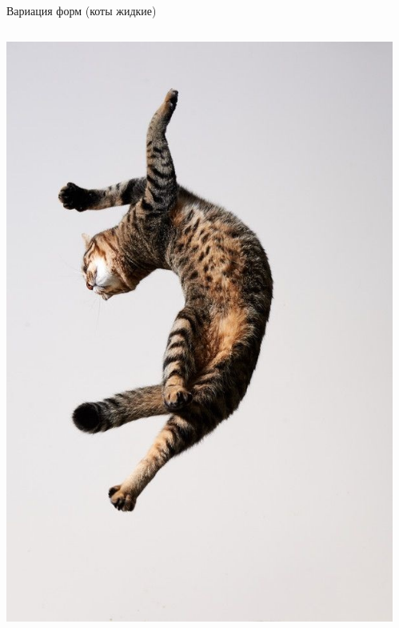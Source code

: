 \documentclass[aspectratio=169, professionalfonts]{beamer}
\begin{document}
\begin{frame}{Вариация форм (коты жидкие)}
\begin{columns}
\begin{column}{.25\linewidth}
            \includegraphics[width=\linewidth]{figures/fig23-cat.jpg}
        \end{column}
        \begin{column}{.25\linewidth}
            \centering

\end{column}
\end{columns}
\end{frame}
\end{document}
